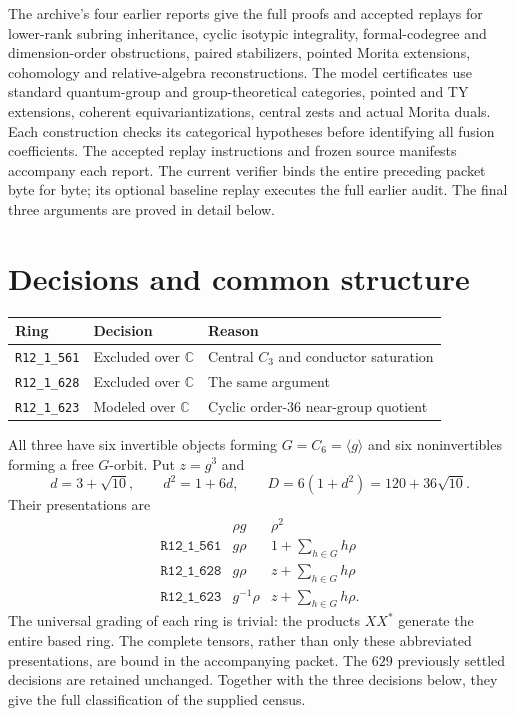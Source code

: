 \documentclass[11pt]{article}
\newcommand{\R}[1]{\texttt{R12\_1\_#1}}
\newcommand{\C}{\mathbb C}
\begin{document}
The archive's four earlier reports give the full proofs and accepted
replays for lower-rank subring inheritance, cyclic isotypic integrality,
formal-codegree and dimension-order obstructions, paired stabilizers,
pointed Morita extensions, cohomology and relative-algebra reconstructions.
The model certificates use standard quantum-group and group-theoretical
categories, pointed and TY extensions, coherent equivariantizations,
central zests and actual Morita duals. Each construction checks its
categorical hypotheses before identifying all fusion coefficients.
The accepted replay instructions and frozen source manifests accompany
each report. The current verifier binds the entire preceding packet
byte for byte; its optional baseline replay executes the full earlier
audit. The final three arguments are proved in detail below.



\section{Decisions and common structure}
\begin{center}
\begin{tabular}{lll}\toprule
Ring & Decision & Reason\\\midrule
\R{561}&Excluded over $\C$&Central $C_3$ and conductor saturation\\
\R{628}&Excluded over $\C$&The same argument\\
\R{623}&Modeled over $\C$&Cyclic order-$36$ near-group quotient\\\bottomrule
\end{tabular}
\end{center}
All three have six invertible objects forming $G=C_6=\langle g\rangle$
and six noninvertibles forming a free $G$-orbit. Put $z=g^3$ and
\[
 d=3+\sqrt{10},\qquad d^2=1+6d,\qquad
 D=6(1+d^2)=120+36\sqrt{10}.
\]
Their presentations are
\[
\begin{array}{c|cc}
 &\rho g&\rho^2\\\hline
\R{561}&g\rho&1+\sum_{h\in G}h\rho\\
\R{628}&g\rho&z+\sum_{h\in G}h\rho\\
\R{623}&g^{-1}\rho&z+\sum_{h\in G}h\rho.
\end{array}
\]
The universal grading of each ring is trivial: the products $XX^*$
generate the entire based ring. The complete tensors, rather than only
these abbreviated presentations, are bound in the accompanying packet.
The $629$ previously settled decisions are retained unchanged. Together with the three decisions below, they give the full classification of the supplied census.
\end{document}

